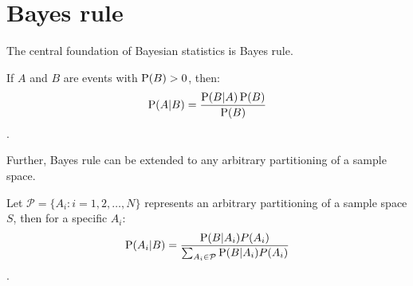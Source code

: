 \section{Bayes rule}

The central foundation of Bayesian statistics is Bayes rule. 
\begin{theorem} If $A$ and $B$ are events with $\operatorname{P}(B)>0$, then:
	\begin{gather}
		\operatorname{P}(A|B) = \frac{\operatorname{P}(B|A)\operatorname{P}(B)}{\operatorname{P}(B)}
	\end{gather}.	
\end{theorem}
Further, Bayes rule can be extended to any arbitrary partitioning of a sample space.
\begin{theorem}
	Let $\mathcal{P}=\{A_i: i=1,2, \hdots, N\}$ represents an arbitrary partitioning of a sample space $S$, then for a specific $A_i$:
	\begin{gather}
			 \operatorname{P}(A_i|B)=\frac{\operatorname{P}(B|A_i)P(A_i)}{\sum_{A_i\in \mathcal{P}}\operatorname{P}(B|A_i)P(A_i)}
	\end{gather}.
\end{theorem}